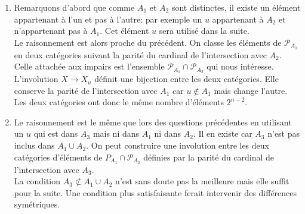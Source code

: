 \begin{enumerate}
\begin{enumerate}
\item Remarquons d'abord que comme $A_1$ et $A_2$ sont distinctes, il existe un élément appartenant à l'un et pas à l'autre: par exemple un $u$ appartenant à $A_2$ et n'appartenant pas à $A_1$. Cet élément $u$ sera utilisé dans la suite.\\
Le raisonnement est alors proche du précédent. On classe les éléments de $\mathcal P_{A_1}$ en deux catégories suivant la parité du cardinal de l'intersection avec $A_2$. Celle attachée aux impairs est l'ensemble $\mathcal P_{A_1}\cap \mathcal P_{A_2}$ qui nous intéresse.\\
L'involution $X\rightarrow X_u$ définit une bijection entre les deux catégories. Elle conserve la parité de l'intersection avec $A_1$ car $u\notin A_1$ mais change l'autre. Les deux catégories ont donc le même nombre d'éléments $2^{n-2}$.

\item Le raisonnement est le même que lors des questions précédentes en utilisant un $u$ qui est dans $A_3$ mais ni dans $A_1$ ni dans $A_2$. Il en existe car $A_3$ n'est pas inclus dans $A_1\cup A_2$. On peut construire une involution entre les deux catégories d'éléments de $P_{A_1}\cap \mathcal P_{A_2}$ définies par la parité du cardinal de l'intersection avec $A_3$.\\
La condition $A_3\not\subset A_1 \cup A_2$ n'est sans doute pas la meilleure mais elle suffit pour la suite. Une condition plus satisfaisante ferait intervenir des différences symétriques.
\end{enumerate}

\end{enumerate}

